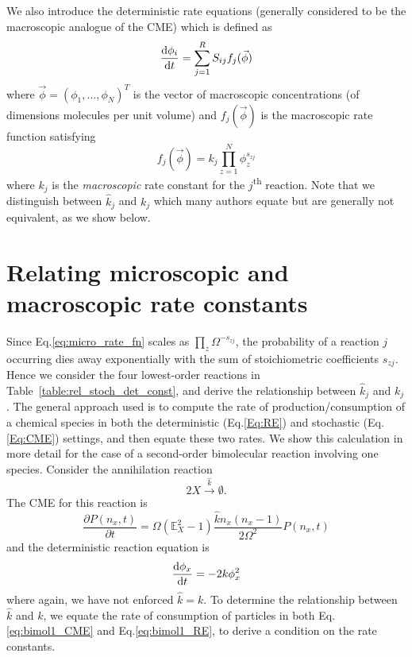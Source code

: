\documentclass[10pt,letterpaper]{article}
\begin{document}
We also introduce the deterministic rate equations (generally considered to be the macroscopic analogue of the CME) which is defined as\cite{Van92,Grima10}
\begin{equation}
\frac{\text{d}\phi_i}{\text{d}t} = \sum_{j=1}^R S_{ij} f_j(\vec{\phi}) \label{Eq:RE}
\end{equation}
where $\vec{\phi}=(\phi_1, \dots, \phi_N)^T$ is the vector of macroscopic concentrations (of dimensions molecules per unit volume) and $f_j(\vec{\phi})$ is the macroscopic rate function satisfying
\begin{equation}
f_j(\vec{\phi}) = k_j \prod_{z=1}^N \phi_z^{s_{zj}} \label{eq:macro_rate_fn}
\end{equation}
where $k_j$ is the \textit{macroscopic} rate constant for the $j$\textsuperscript{th} reaction. Note that we distinguish between $\hat{k}_j$ and $k_j$ which many authors equate\cite{Grima10, Grima11, Van92} but are generally not equivalent, as we show below.

\section{Relating microscopic and macroscopic rate constants}\label{sec:rcs}

Since Eq.\eqref{eq:micro_rate_fn} scales as $\prod_z\Omega^{-s_{zj}}$, the probability of a reaction $j$ occurring dies away exponentially with the sum of stoichiometric coefficients $s_{zj}$. Hence we consider the four lowest-order reactions in Table~\ref{table:rel_stoch_det_const}, and derive the relationship between $\hat{k}_j$ and $k_j$. The general approach used\cite{Wilkinson11} is to compute the rate of production/consumption of a chemical species in both the deterministic (Eq.\eqref{Eq:RE}) and stochastic (Eq.\eqref{Eq:CME}) settings, and then equate these two rates. We show this calculation in more detail for the case of a second-order bimolecular reaction involving one species. Consider the annihilation reaction
\begin{equation}
2X \xrightarrow{\hat{k}} \emptyset.
\end{equation}
The CME for this reaction is
\begin{equation}
\frac{\partial P(n_x,t)}{\partial t} = \Omega \left( \mathbb{E}_X^2 - 1 \right) \frac{\hat{k}n_x (n_x - 1)}{2\Omega^2} P(n_x,t) \label{eq:bimol1_CME}
\end{equation}
and the deterministic reaction equation is
\begin{equation}
\frac{\text{d}\phi_x}{\text{d}t} = -2k\phi_x^2 \label{eq:bimol1_RE}
\end{equation}
where again, we have not enforced $\hat{k}=k$. To determine the relationship between $\hat{k}$ and $k$, we equate the rate of consumption of particles in both Eq.\eqref{eq:bimol1_CME} and Eq.\eqref{eq:bimol1_RE}, to derive a condition on the rate constants\cite{Wilkinson11}. 
\end{document}
